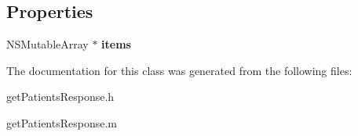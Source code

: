 \subsection*{Properties}
\begin{DoxyCompactItemize}
\item 
\hypertarget{interfaceget_patients_response_a3b0888d35c57f9a647075bf6b67e37eb}{}N\+S\+Mutable\+Array $\ast$ {\bfseries items}\label{interfaceget_patients_response_a3b0888d35c57f9a647075bf6b67e37eb}

\end{DoxyCompactItemize}


The documentation for this class was generated from the following files\+:\begin{DoxyCompactItemize}
\item 
get\+Patients\+Response.\+h\item 
get\+Patients\+Response.\+m\end{DoxyCompactItemize}
